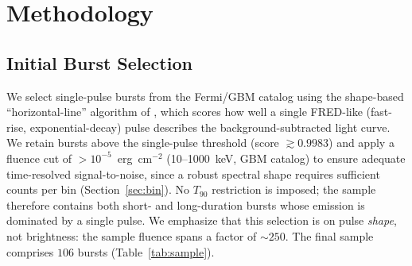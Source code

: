 \section{Methodology} \label{sec:method}
\subsection{Initial Burst Selection} \label{sec:sel}
We select single-pulse bursts from the Fermi/GBM catalog
\citep{Meegan2009,Gruber2014} using the shape-based ``horizontal-line'' algorithm
of \citet{Busby2024}, which scores how well a single FRED-like (fast-rise,
exponential-decay) pulse describes the background-subtracted light curve. We retain bursts above the \citeauthor{Busby2024}
single-pulse threshold (score $\gtrsim0.9983$) and apply a fluence cut of
$>$$10^{-5}$~erg~cm$^{-2}$ (10--1000~keV, GBM catalog) to ensure adequate
time-resolved signal-to-noise, since a robust spectral shape requires
sufficient counts per bin (Section~\ref{sec:bin}). No $T_{90}$ restriction is
imposed; the sample therefore contains both short- and long-duration bursts whose
emission is dominated by a single pulse. We emphasize that this selection is on
pulse \emph{shape}, not brightness: the sample fluence spans a factor of
$\sim$$250$. The final sample comprises \textbf{$106$} bursts
(Table~\ref{tab:sample}).

